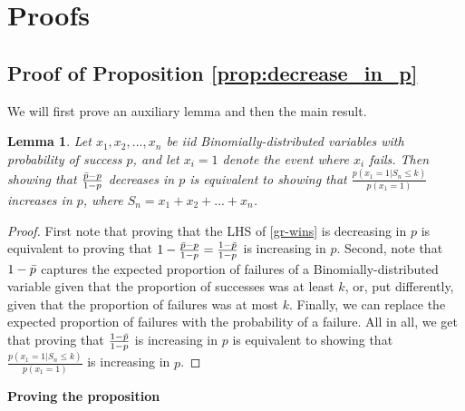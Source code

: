 \documentclass[12pt,a4paper]{article}
\newtheorem{lemma}{Lemma}
\begin{document}
\printbibliography


\newpage
\appendix
\renewcommand*\thetable{\Alph{section}.\arabic{table}}
\renewcommand*\thefigure{\Alph{section}.\arabic{figure}}
\setcounter{figure}{0}
\setcounter{table}{0}
\setcounter{equation}{0}
\section{Proofs}
\label{sec:proofs}
\subsection{Proof of Proposition \ref{prop:decrease_in_p}}
We will first prove an auxiliary lemma and then the main result.
\begin{lemma}
\label{lemma:eqiv_formulation}
Let $x_1,x_2,...,x_n$ be iid Binomially-distributed variables with probability of success $p$, and let $x_i=1$ denote the event where $x_i$ fails. Then showing that $\frac{ \bar{p} - p}{ 1 - p}$ decreases in $p$ is equivalent to showing that $\frac{p(x_1=1|S_n \leq k)}{p(x_1=1)}$ increases in $p$, where $S_n=x_1+x_2+...+x_n$.
\end{lemma}
\begin{proof}
First note that proving that the LHS of \eqref{gr-wins} is decreasing in $p$ is equivalent to proving that $1-\frac{ \bar{p} - p}{ 1 - p} = \frac{ 1- \bar{p}}{ 1 - p}$ is increasing in $p$. Second, note that 
$1- \bar{p}$ captures the expected proportion of failures of a Binomially-distributed variable given that the proportion of successes was at least $k$, or, put differently, given that the proportion of failures was at most $k$. Finally, we can replace the expected proportion of failures with the probability of a failure. All in all, we get that proving that $\frac{ 1- \bar{p}}{ 1 - p}$ is increasing in $p$ is equivalent to showing that $\frac{p(x_1=1|S_n \leq k)}{p(x_1=1)}$ is increasing in $p$.
\end{proof}
\vspace{0.3cm}

\noindent \textbf{Proving the proposition}
\vspace{0.3cm}
\end{document}
